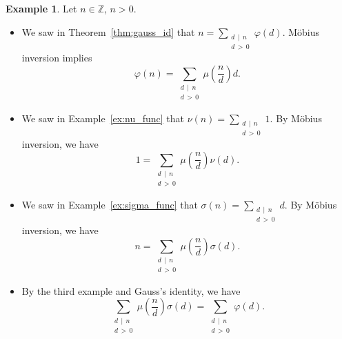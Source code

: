 \documentclass{amsbook}
\theoremstyle{plain}
\theoremstyle{definition}
\newtheorem{example}[theorem]{Example}
\theoremstyle{remark}
\numberwithin{equation}{chapter}
\numberwithin{figure}{chapter}
\newcommand{\Z}{\mathbb{Z}}
\begin{document}
\begin{example}
  Let $n \in \Z$, $n > 0$.
  \begin{itemize}
  \item We saw in Theorem~\ref{thm:gauss_id} that $n = \sum_{\substack{d \, \mid \, n \\ d \, > \, 0}} \varphi (d)$. M\"obius inversion implies
    \[
      \varphi (n) = \sum_{\substack{d \, \mid \, n \\ d \, > \, 0}} \mu \left( \frac{n}d \right) d.
    \]
  \item We saw in Example~\ref{ex:nu_func} that $\nu (n) = \sum_{\substack{d \, \mid \, n \\ d \, > \, 0}} 1$. By M\"obius inversion, we have
    \[
      1 = \sum_{\substack{d \, \mid \, n \\ d \, > \, 0}} \mu \left( \frac{n}d \right) \nu (d).
    \]
  \item We saw in Example~\ref{ex:sigma_func} that $\sigma (n) = \sum_{\substack{d \, \mid \, n \\ d \, > \, 0}} d$. By M\"obius inversion, we have
    \[
      n = \sum_{\substack{d \, \mid \, n \\ d \, > \, 0}} \mu \left( \frac{n}d \right) \sigma (d).
    \]
  \item By the third example and Gauss's identity, we have
    \[
      \sum_{\substack{d \, \mid \, n \\ d \, > \, 0}} \mu \left( \frac{n}d \right) \sigma (d) = \sum_{\substack{d \, \mid \, n \\ d \, > \, 0}} \varphi (d).
    \]
  \end{itemize}
\end{example}
\end{document}

